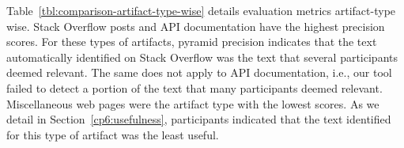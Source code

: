 



Table~\ref{tbl:comparison-artifact-type-wise} details evaluation metrics artifact-type wise. 
Stack Overflow posts and API documentation have the highest precision scores. For these types of artifacts, pyramid precision indicates that the 
text automatically identified on Stack Overflow was the text that several participants deemed relevant. 
The same does not apply to API documentation, i.e., our tool failed to detect a portion of the text that many participants deemed relevant. 
Miscellaneous web pages were the artifact type with the lowest scores. As we detail in Section~\ref{cp6:usefulness},
participants indicated that the text identified for this type of artifact was the least useful.










